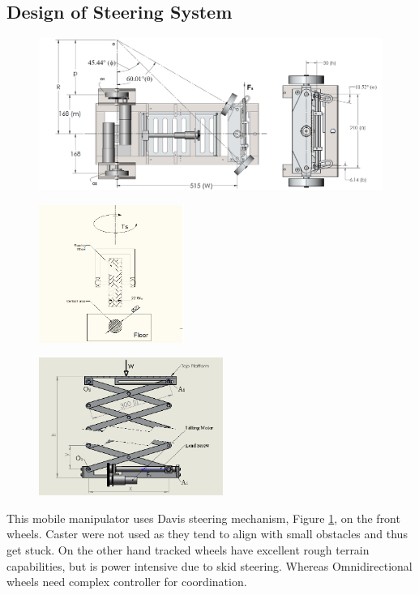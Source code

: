 \subsection{Design of Steering System }
 \begin{figure}
 	\centering
	\includegraphics[width=\linewidth,keepaspectratio]{Chapter3/fig/steer}
	\label{fig:davis} 
\end{figure} 
\begin{figure}
	\centering
	\begin{minipage}{.5\textwidth}
		\centering
		\includegraphics[width=.8\linewidth,height=4.5cm,keepaspectratio]{Chapter3/fig/steerTorqCal}
		\label{fig:steerTorq}
	\end{minipage}%
	\begin{minipage}{.5\textwidth}
		\centering
		\includegraphics[width=.8\linewidth,height=4.5cm,keepaspectratio]{Chapter3/fig/scissor}
		\label{fig:scissor}
	\end{minipage}
\end{figure}
This mobile manipulator uses Davis steering mechanism,  Figure \ref{fig:davis},  on the front wheels. Caster  were not used as they tend to align with small obstacles and thus get stuck. On the  other hand tracked wheels have excellent rough terrain capabilities, but is power intensive due to skid steering. Whereas  Omnidirectional wheels need complex controller for coordination.  

